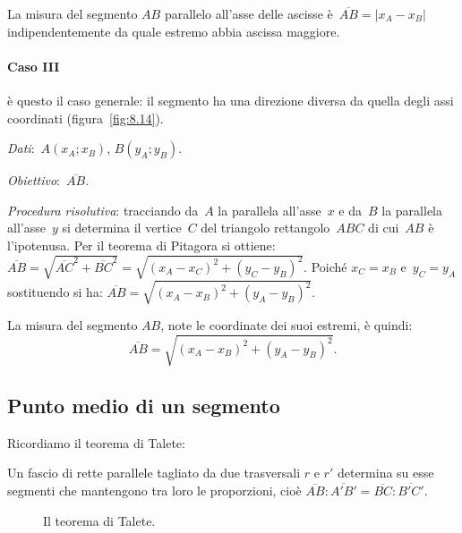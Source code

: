 La misura del segmento $AB$ parallelo all'asse delle ascisse è~$\overline{AB}=|x_{A}-x_{B}|$
indipendentemente da quale estremo abbia ascissa maggiore.

\paragraph{Caso III} è questo il caso generale: il segmento ha una direzione diversa da quella degli assi coordinati (figura~\ref{fig:8.14}).

\emph{Dati}:~$A(x_A;x_B)$, $B(y_A;y_B)$.

\emph{Obiettivo}:~$\overline{AB}$.

\emph{Procedura risolutiva}: tracciando da~$A$ la parallela all'asse~$x$ e da~$B$ la parallela all'asse~$y$
si determina il vertice~$C$ del triangolo rettangolo~$ABC$ di cui~$AB$ è l'ipotenusa.
Per il teorema di Pitagora si ottiene:~$\overline{AB}=\sqrt{\overline{AC}^2 + \overline{BC}^2}=\sqrt{\left(x_A-x_C \right)^2+
\left(y_C-y_B \right)^2}$. %
Poiché $x_{C}=x_{B}$ e~$y_{C}=y_{A}$ sostituendo si ha:
$\overline{AB}=\sqrt{\left(x_{A}-x_{B}\right)^{2}+\left(y_{A}-y_{B}\right)^{2}}$.

La misura del segmento $AB$, note le coordinate dei suoi estremi, è quindi:
\[\overline{AB}=\sqrt{\left(x_{A}-x_{B}\right)^{2}+\left(y_{A}-y_{B}\right)^{2}}.\]

\ovalbox{\risolvii  \ref{ese:\thechapter.21}, \ref{ese:\thechapter.22}, \ref{ese:\thechapter.23}, \ref{ese:\thechapter.24}, \ref{ese:\thechapter.25}, \ref{ese:\thechapter.26},
\ref{ese:\thechapter.27}, \ref{ese:\thechapter.28}, \ref{ese:\thechapter.29}, \ref{ese:\thechapter.30}, \ref{ese:\thechapter.31}, \ref{ese:\thechapter.32}, \ref{ese:\thechapter.33}}
\pagebreak
\subsection{Punto medio di un segmento}
Ricordiamo il teorema di Talete:

\begin{teorema}[di Talete]
Un fascio di rette parallele tagliato da due trasversali $r$ e $r'$ determina su esse segmenti che mantengono tra loro le proporzioni, cioè $\overline{AB}:\overline{A'B'}=\overline{BC}:\overline{B'C'}$.
\end{teorema}

\begin{figure}[h]
 \centering
 \caption{Il teorema di Talete.}\label{fig:8.15}
 \end{figure}

